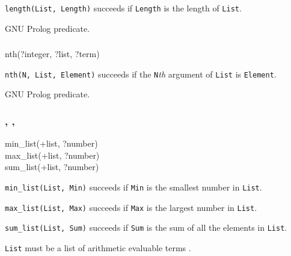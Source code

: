 \Description

\texttt{length(List, Length)} succeeds if \texttt{Length} is the length of
\texttt{List}.

\begin{PlErrors}


\end{PlErrors}

GNU Prolog predicate.

\subsubsection{}

\begin{TemplatesOneCol}
nth(?integer, ?list, ?term)

\end{TemplatesOneCol}

\Description

\texttt{nth(N, List, Element)} succeeds if the \texttt{N}\emph{th}
argument of \texttt{List} is \texttt{Element}.

\PlErrorsNone

\Portability

GNU Prolog predicate.

\subsubsection{,
               ,
               }

\begin{TemplatesOneCol}
min\_list(+list, ?number)\\
max\_list(+list, ?number)\\
sum\_list(+list, ?number)

\end{TemplatesOneCol}

\Description

\texttt{min\_list(List, Min)} succeeds if \texttt{Min} is the
smallest number in \texttt{List}.

\texttt{max\_list(List, Max)} succeeds if \texttt{Max} is the
largest number in \texttt{List}.

\texttt{sum\_list(List, Sum)} succeeds if \texttt{Sum} is the
sum of all the elements in \texttt{List}.

\texttt{List} must be a list of arithmetic evaluable terms
.

